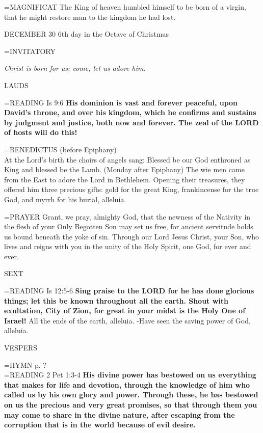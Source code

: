 \hangindent=\parindent \small{MAGNIFICAT 	The King of heaven humbled himself to be born of a virgin, that he might restore man to the kingdom he had lost.\\}

DECEMBER 30
6th day in the Octave of Christmas

\hangindent=\parindent \small{INVITATORY	}
\begin{center}
\textit{Christ is born for us; come, let us adore him.\\}
\end{center}

\begin{flushleft}\normalsize LAUDS\\\end{flushleft}
\hangindent=\parindent \small{READING}    Is 9:6 \textbf{   His dominion is vast and forever peaceful, upon David’s throne, and over his kingdom, which he confirms and sustains by judgment and justice, both now and forever. The zeal of the LORD of hosts will do this!\\}

\hangindent=\parindent \small{BENEDICTUS  (before Epiphany)\\}
At the Lord's birth the choirs of angels sang: Blessed be our God enthroned as King and blessed be the Lamb.
(Monday after Epiphany)
The wie men came from the East to adore the Lord in Bethlehem. Opening their treasures, they offered him three precious gifts: gold for the great King, frankincense for the true God, and myrrh for his burial, alleluia.

\hangindent=\parindent \small{PRAYER 	Grant, we pray, almighty God, that the newness of the Nativity in the flesh of your Only Begotten Son may set us free, for ancient servitude holds us bound beneath the yoke of sin. Through our Lord Jesus Christ, your Son, who lives and reigns with you in the unity of the Holy Spirit, one God, for ever and ever.}

\begin{flushleft}\normalsize SEXT\\\end{flushleft}
\hangindent=\parindent \small{READING}    Is 12:5-6 \textbf{   Sing praise to the LORD for he has done glorious things; let this be known throughout all the earth. Shout with exultation, City of Zion, for great in your midst is the Holy One of Israel!}
All the ends of the earth, alleluia.
-Have seen the saving power of God, alleluia.

\begin{flushleft}\normalsize VESPERS\\\end{flushleft}
\hangindent=\parindent \small{\uppercase{HYMN} p.  ?\\}
\hangindent=\parindent \small{READING}    2 Pet 1:3-4 \textbf{   His divine power has bestowed on us everything that makes for life and devotion, through the knowledge of him who called us by his own glory and power. Through these, he has bestowed on us the precious and very great promises, so that through them you may come to share in the divine nature, after escaping from the corruption that is in the world because of evil desire.\\}

